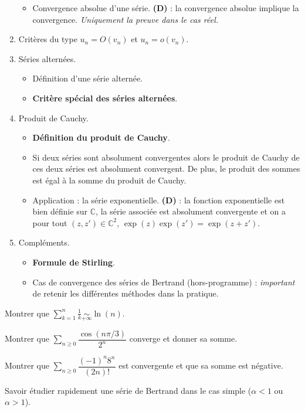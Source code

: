 \documentclass[twoside,a4paper,french,10pt]{VcCours}
\begin{document}
\begin{enumerate}
\begin{itemize}
\item Convergence absolue d'une série. \textbf{(D)} : la convergence absolue implique la convergence. \textit{Uniquement la preuve dans le cas réel.}
\end{itemize} 
\item Critères du type $u_n = O(v_n)$ et $u_n= o(v_n)$.
\item Séries alternées.
\begin{itemize}
\item Définition d'une série alternée.
\item \textbf{Critère spécial des séries alternées}.
\end{itemize}
\item Produit de Cauchy.
\begin{itemize}
\item \textbf{Définition du produit de Cauchy}.
\item Si deux séries sont absolument convergentes alors le produit de Cauchy de ces deux séries est absolument convergent. De plus, le produit des sommes est égal à la somme du produit de Cauchy.
\item Application : la série exponentielle. \textbf{(D)} : la fonction exponentielle est bien définie sur $\mathbb{C}$, la série associée est absolument convergente et on a pour tout $(z,z') \in \mathbb{C}^2$, $\exp(z)\exp(z')= \exp(z+z')$.
\end{itemize}
\item Compléments.
\begin{itemize}
\item \textbf{Formule de Stirling}.
\item Cas de convergence des séries de Bertrand (hors-programme) : \textit{important} de retenir les différentes méthodes dans la pratique.
\end{itemize}
\end{enumerate}

\medskip

\begin{Exercice}
Montrer que $\sum_{k=1}^n \frac{1}{k} \underset{+ \infty}{\sim} \ln(n)$.
\end{Exercice}

\begin{Exercice}
    Montrer que $\sum_{n \geq 0} \dfrac{\cos(n \pi/3)}{2^n}$ converge et donner sa somme.
\end{Exercice}

\begin{Exercice}
    Montrer que $\sum_{n \geq 0} {\dfrac{( - 1)^n 8^n}{(2n)!}}$ est convergente et que sa somme est négative.
\end{Exercice}

\begin{Exercice}
    Savoir étudier rapidement une série de Bertrand dans le \og cas simple \fg{} ($\alpha<1$ ou $\alpha>1$).
\end{Exercice}                        
\end{document}
